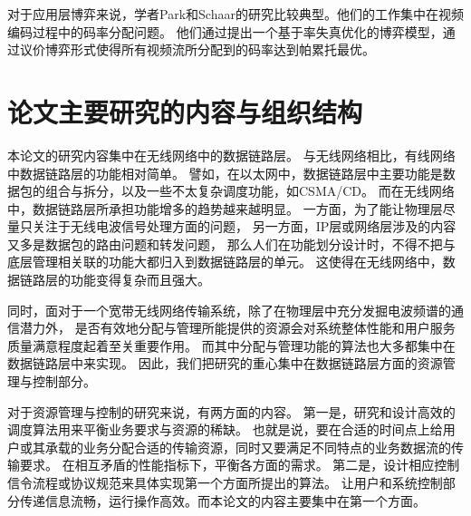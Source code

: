 对于应用层博弈来说，学者Park和Schaar的研究比较典型。他们的工作集中在视频编码过程中的码率分配问题\cite{ParkSchaar:2007}\cite{ParkSchaar:2007ICASSP}。
他们通过提出一个基于率失真优化的博弈模型，通过议价博弈形式使得所有视频流所分配到的码率达到帕累托最优。

\section{论文主要研究的内容与组织结构}
本论文的研究内容集中在无线网络中的数据链路层。
与无线网络相比，有线网络中数据链路层的功能相对简单。
譬如，在以太网中，数据链路层中主要功能是数据包的组合与拆分，以及一些不太复杂调度功能，如CSMA/CD。
而在无线网络中，数据链路层所承担功能增多的趋势越来越明显。
一方面，为了能让物理层尽量只关注于无线电波信号处理方面的问题，
另一方面，IP层或网络层涉及的内容又多是数据包的路由问题和转发问题，
那么人们在功能划分设计时，不得不把与底层管理相关联的功能大都归入到数据链路层的单元。
这使得在无线网络中，数据链路层的功能变得复杂而且强大。

同时，面对于一个宽带无线网络传输系统，除了在物理层中充分发掘电波频谱的通信潜力外，
是否有效地分配与管理所能提供的资源会对系统整体性能和用户服务质量满意程度起着至关重要作用。
而其中分配与管理功能的算法也大多都集中在数据链路层中来实现。
因此，我们把研究的重心集中在数据链路层方面的资源管理与控制部分。

对于资源管理与控制的研究来说，有两方面的内容。
第一是，研究和设计高效的调度算法用来平衡业务要求与资源的稀缺。
也就是说，要在合适的时间点上给用户或其承载的业务分配合适的传输资源，同时又要满足不同特点的业务数据流的传输要求。
在相互矛盾的性能指标下，平衡各方面的需求。
第二是，设计相应控制信令流程或协议规范来具体实现第一个方面所提出的算法。
让用户和系统控制部分传递信息流畅，运行操作高效。而本论文的内容主要集中在第一个方面。

